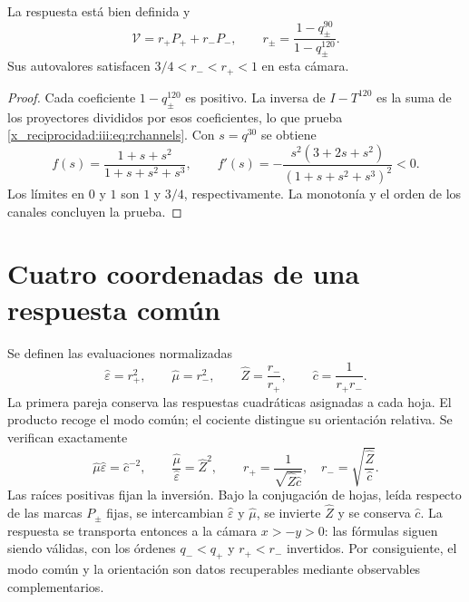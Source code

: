 \begin{proposition}
La respuesta está bien definida y
\begin{equation}
 \mathcal V=r_+P_++r_-P_-,\qquad
 r_\pm=\frac{1-q_\pm^{90}}{1-q_\pm^{120}}.
 \label{x_reciprocidad:iii:eq:rchannels}
\end{equation}
Sus autovalores satisfacen $3/4<r_-<r_+<1$ en esta cámara.
\end{proposition}
\begin{proof}
Cada coeficiente $1-q_\pm^{120}$ es positivo. La inversa de $I-T^{120}$
es la suma de los proyectores divididos por esos coeficientes, lo que prueba
\eqref{x_reciprocidad:iii:eq:rchannels}. Con $s=q^{30}$ se obtiene
\begin{equation}
 f(s)=\frac{1+s+s^2}{1+s+s^2+s^3},\qquad
 f'(s)=-\frac{s^2(3+2s+s^2)}{(1+s+s^2+s^3)^2}<0.
 \label{x_reciprocidad:iii:eq:monotone}
\end{equation}
Los límites en $0$ y $1$ son $1$ y $3/4$, respectivamente. La monotonía
y el orden de los canales concluyen la prueba.
\end{proof}

\section{Cuatro coordenadas de una respuesta común}

Se definen las evaluaciones normalizadas
\begin{equation}
 \widehat\varepsilon=r_+^2,\qquad
 \widehat\mu=r_-^2,\qquad
 \widehat Z=\frac{r_-}{r_+},\qquad
 \widehat c=\frac1{r_+r_-}.
 \label{x_reciprocidad:iii:eq:four}
\end{equation}
La primera pareja conserva las respuestas cuadráticas asignadas a cada hoja.
El producto recoge el modo común; el cociente distingue su orientación relativa.
Se verifican exactamente
\begin{equation}
 \widehat\mu\widehat\varepsilon=\widehat c^{-2},\qquad
 \frac{\widehat\mu}{\widehat\varepsilon}=\widehat Z^2,
 \qquad
 r_+=\frac1{\sqrt{\widehat Z\widehat c}},\quad
 r_-=\sqrt{\frac{\widehat Z}{\widehat c}}.
 \label{x_reciprocidad:iii:eq:four-identities}
\end{equation}
Las raíces positivas fijan la inversión. Bajo la conjugación de hojas,
leída respecto de las marcas $P_\pm$ fijas, se
intercambian $\widehat\varepsilon$ y $\widehat\mu$, se invierte
$\widehat Z$ y se conserva $\widehat c$. La respuesta se transporta entonces
a la cámara $x>-y>0$: las fórmulas siguen siendo válidas, con los órdenes
$q_-<q_+$ y $r_+<r_-$ invertidos. Por consiguiente, el modo común
y la orientación son datos recuperables mediante observables complementarios.

